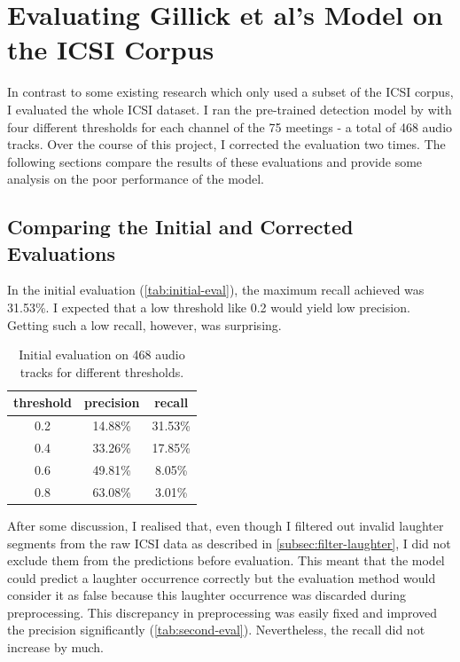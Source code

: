 \documentclass[bsc,frontabs,parskip,deptreport]{infthesis}
\begin{document}
\section{Evaluating Gillick et al's Model on the ICSI Corpus}
In contrast to some existing research \citep{kennedy2004laughter, knox2006automatic} which only used a subset of the ICSI corpus, I evaluated the whole ICSI dataset.
I ran the pre-trained detection model by \citet{gillick2021robust} with four different thresholds for each channel of the 75 meetings - a total of 468 audio tracks. 
Over the course of this project, I corrected the evaluation two times.
The following sections compare the results of these evaluations and provide some analysis on the poor performance of the model.

\subsection{Comparing the Initial and Corrected Evaluations}
In the initial evaluation (\autoref{tab:initial-eval}), the maximum recall achieved was 31.53\%. I expected that a low threshold like 0.2 would yield low precision. Getting such a low recall, however, was surprising. 
\begin{table}[h!]
    \centering
    \begin{tabular}{|c|c|c|}
    \hline
    threshold & precision & recall \\
    \hline
        0.2 &  14.88\% & 31.53\% \\ 
        0.4 &  33.26\% & 17.85\% \\
        0.6 &  49.81\% & 8.05\%  \\
        0.8 &  63.08\% & 3.01\%  \\
     \hline
    \end{tabular}
    \caption{Initial evaluation on 468 audio tracks for different thresholds.}
    \label{tab:initial-eval}
\end{table}



After some discussion, I realised that, even though I filtered out invalid laughter segments from the raw ICSI data as described in \autoref{subsec:filter-laughter}, I did not exclude them from the predictions before evaluation. 
This meant that the model could predict a laughter occurrence correctly but the evaluation method would consider it as false because this laughter occurrence was discarded during preprocessing.
This discrepancy in preprocessing was easily fixed and improved the precision significantly (\autoref{tab:second-eval}). Nevertheless, the recall did not increase by much. 
\end{document}
